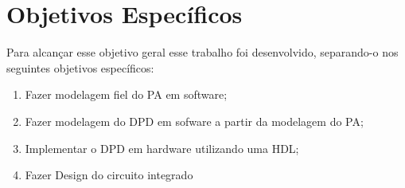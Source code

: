 \section{Objetivos Específicos}
Para alcançar esse objetivo geral esse trabalho foi desenvolvido, separando-o nos seguintes objetivos específicos:

\begin{enumerate}
    \item Fazer modelagem fiel do PA em software;
    \item Fazer modelagem do DPD em sofware a partir da modelagem do PA;
    \item Implementar o DPD em hardware utilizando uma HDL;
    \item Fazer Design do circuito integrado
\end{enumerate}
